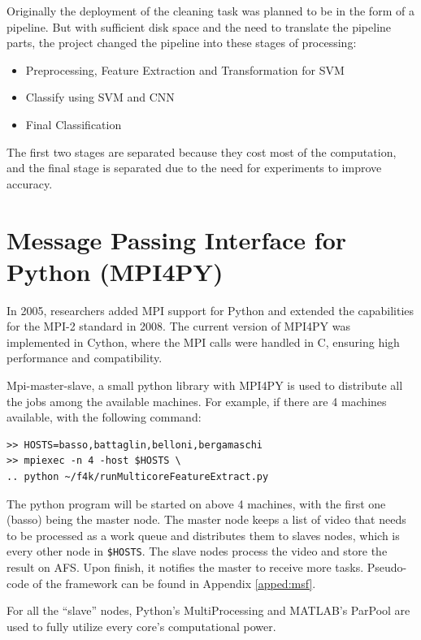 \documentclass[bsc,logo,twoside,fullspacing,parskip]{infthesis}
\begin{document}
Originally the deployment of the cleaning task was planned to be in the form of a pipeline.
But with sufficient disk space and the need to translate the pipeline parts, the project changed the pipeline into these stages of processing:

\begin{itemize}
   \setlength{\parskip}{0pt}
   \item Preprocessing, Feature Extraction and Transformation for SVM
   \item Classify using SVM and CNN
   \item Final Classification
\end{itemize}
The first two stages are separated because they cost most of the computation, and the final stage is separated due to the need for experiments to improve accuracy.

\section{Message Passing Interface for Python (MPI4PY)}

In 2005, researchers added MPI support for Python\cite{MPI4PY} and extended the capabilities for the MPI-2 standard in 2008\cite{MPI4PY2}. The current version of MPI4PY\cite{MPI4PY3} was implemented in Cython, where the MPI calls were handled in C, ensuring high performance and compatibility.

Mpi-master-slave\cite{L5}, a small python library with MPI4PY is used to distribute all the jobs among the available machines. 
For example, if there are 4 machines available, with the following command: 
\lstset{basicstyle=\footnotesize\ttfamily,breaklines=true}
\begin{lstlisting}[frame=single]
>> HOSTS=basso,battaglin,belloni,bergamaschi
>> mpiexec -n 4 -host $HOSTS \
.. python ~/f4k/runMulticoreFeatureExtract.py
\end{lstlisting}
The python program will be started on above 4 machines, with the first one (basso) being the master node.
The master node keeps a list of video that needs to be processed as a work queue and distributes them to slaves nodes, which is every other node in {\tt \$HOSTS}. 
The slave nodes process the video and store the result on AFS. Upon finish, it notifies the master to receive more tasks. Pseudo-code of the framework can be found in Appendix \ref{apped:msf}.

For all the ``slave'' nodes, Python's MultiProcessing and MATLAB's ParPool are used to fully utilize every core's computational power.
\end{document}
